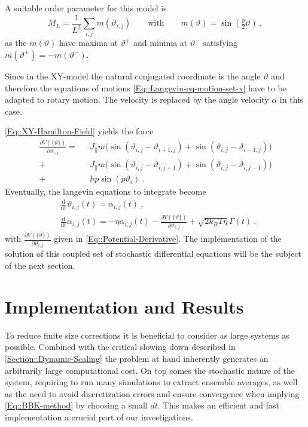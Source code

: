 		A suitable order parameter for this model is 
		\begin{equation} \label{Eq::Si-Order-Param}
			M_L =	\frac{1}{L^2} \sum_{i,j} m(\vartheta_{i, j}) \qquad \text{with} \qquad	m(\vartheta) =	\sin \left(\tfrac{p}{2} \vartheta\right) ~,
		\end{equation}
		as the $m(\vartheta)$ have maxima at $\vartheta^{+}$ and minima at $\vartheta^{-}$ satisfying $m(\vartheta^+) =	- m (\vartheta^-)$.
		
		Since in the XY-model the natural conjugated coordinate is the angle $\vartheta$ and therefore the equations of motions \autoref{Eq::Langevin-eq-motion-set-x} have to be adapted to rotary motion. The velocity is replaced by the angle velocity $\alpha$ in this case.
		
		\autoref{Eq::XY-Hamilton-Field} yields the force
		\begin{equation} \label{Eq::Potential-Derivative}
			\begin{split}
							\frac{\partial V(\{\vartheta\})}{\partial \vartheta_{i, j}} = ~~~& J_\parallel m \Big( \sin \left(\vartheta_{i,j} - \vartheta_{i + 1, j} \right) +   \sin \left(\vartheta_{i,j} - \vartheta_{i-1, j} \right) \Big)	 \\
							 + &J_\parallel m \Big( \sin \left(\vartheta_{i,j} - \vartheta_{i, j+1} \right) +  \sin \left(\vartheta_{i,j} - \vartheta_{i, j-1} \right) \Big) \\
							 + &h p \sin(p\vartheta_i)~.
			\end{split}
 		\end{equation}
 		Eventually, the langevin equations to integrate become
 		\begin{align}
 			&\frac{\text{d}}{\text{dt}} \vartheta_{i,j}(t) =	 \alpha_{i,j}(t)~, \\
 			&\frac{\text{d}}{\text{dt}} \alpha_{i,j}(t) =	- \eta \alpha_{i,j}(t) - \frac{\partial V(\{\vartheta\})}{\partial \vartheta_{i,j}} + \sqrt{2 k_B T \eta} \Gamma(t)~,
 		\end{align}
 		with $\frac{\partial V(\{\vartheta\})}{\partial \vartheta_{i,j}}$ given in \autoref{Eq::Potential-Derivative}. The implementation of the solution of this coupled set of stochastic differential equations will be the subject of the next section.
\chapter{Implementation and Results}
	To reduce finite size corrections it is beneficial to consider as large systems as possible. Combined with the critical slowing down described in  \autoref{Section::Dynamic-Scaling} the problem at hand inherently generates an arbitrarily large computational cost. On top comes the stochastic nature of the system, requiring to run many simulations to extract ensemble averages, as well as the need to avoid discretization errors and ensure convergence when implying \autoref{Eq::BBK-method} by choosing a small $dt$. This makes an efficient and fast implementation a crucial part of our investigations.
